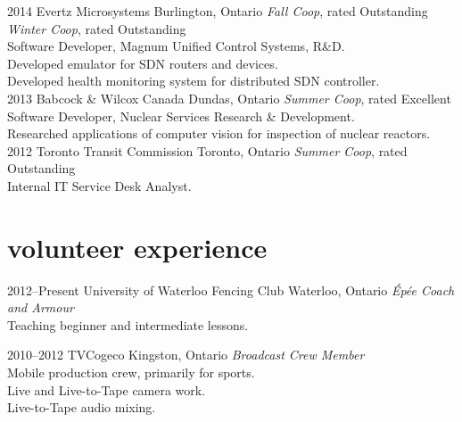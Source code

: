 \documentclass[]{eliot-cv} %
\begin{document}
\begin{entrylist}

\entry
{2014}
{Evertz Microsystems}
{Burlington, Ontario}
{\emph{Fall Co\-op}, rated Outstanding \\
\emph{Winter Co\-op}, rated Outstanding \\
Software Developer, Magnum Unified Control Systems, R\&D. \\
Developed emulator for SDN routers and devices. \\
Developed health monitoring system for distributed SDN controller. \\}
\entry
{2013}
{Babcock \& Wilcox Canada}
{Dundas, Ontario}
{\emph{Summer Co\-op}, rated Excellent \\
Software Developer, Nuclear Services Research \& Development. \\
Researched applications of computer vision for inspection of nuclear reactors. \\}
\entry
{2012}
{Toronto Transit Commission}
{Toronto, Ontario}
{\emph{Summer Co\-op}, rated Outstanding \\
Internal IT Service Desk Analyst.}

\end{entrylist}

\section{volunteer experience}

\begin{entrylist}

\entry
{2012--Present}
{University of Waterloo Fencing Club}
{Waterloo, Ontario}
{\emph{\'{E}p\'{e}e Coach and Armour} \\
Teaching beginner and intermediate lessons. \\}

\entry
{2010--2012}
{TVCogeco}
{Kingston, Ontario}
{\emph{Broadcast Crew Member} \\
Mobile production crew, primarily for sports. \\
Live and Live-to-Tape camera work. \\
Live-to-Tape audio mixing.}
\end{entrylist}
\end{document}
